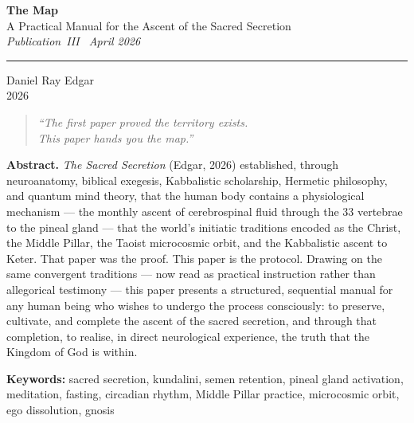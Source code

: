 \documentclass[12pt, a4paper]{article}
\begin{document}

\begin{titlepage}
  \centering
  \vspace*{2cm}

  {\LARGE\bfseries The Map}\\[0.8em]
  {\large A Practical Manual for the Ascent of the Sacred Secretion}\\[0.4em]
  {\normalsize\itshape Publication~III \textbullet\ April 2026}

  \vspace{2cm}
  \rule{0.5\linewidth}{0.5pt}
  \vspace{2cm}

  {\large Daniel Ray Edgar}\\[0.4em]
  {\normalsize 2026}

  \vfill

  \begin{quote}
    \itshape\centering
    ``The first paper proved the territory exists.\\
    This paper hands you the map.''
  \end{quote}

  \vspace{1cm}
  \noindent\textbf{Abstract.}\quad
  \emph{The Sacred Secretion} (Edgar, 2026) established, through neuroanatomy,
  biblical exegesis, Kabbalistic scholarship, Hermetic philosophy, and quantum
  mind theory, that the human body contains a physiological mechanism — the
  monthly ascent of cerebrospinal fluid through the 33 vertebrae to the pineal
  gland — that the world's initiatic traditions encoded as the Christ, the
  Middle Pillar, the Taoist microcosmic orbit, and the Kabbalistic ascent to
  Keter. That paper was the proof. This paper is the protocol. Drawing on the
  same convergent traditions — now read as practical instruction rather than
  allegorical testimony — this paper presents a structured, sequential manual
  for any human being who wishes to undergo the process consciously: to
  preserve, cultivate, and complete the ascent of the sacred secretion, and
  through that completion, to realise, in direct neurological experience, the
  truth that the Kingdom of God is within.

  \vspace{0.5cm}
  \noindent\textbf{Keywords:} sacred secretion, kundalini, semen retention,
  pineal gland activation, meditation, fasting, circadian rhythm,
  Middle Pillar practice, microcosmic orbit, ego dissolution, gnosis

\end{titlepage}
\end{document}
